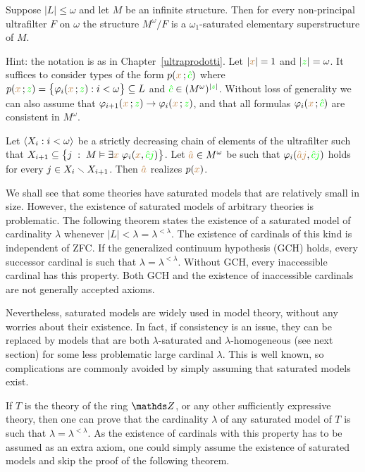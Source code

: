 \documentclass[creche.tex]{subfiles}
\begin{document}
\begin{exercise}
Suppose $|L|\le\omega$ and let $M$ be an infinite structure. Then for every non-principal ultrafilter $F$ on $\omega$ the structure $M^\omega/F$ is a $\omega_1$-saturated elementary superstructure of $M$.

Hint: the notation is as in Chapter~\ref{ultraprodotti}. Let $|{\color{brown} x}|=1$ and 
$|{\color{green} z}|=\omega$. It suffices to consider types of the form $p({\color{brown} x}\,;{\color{green}\hat c})$ where $p({\color{brown} x}\,;{\color{green} z})=\big\{\varphi_i({\color{brown} x}\,;{\color{green} z}):i<\omega\big\}\subseteq L$ and ${\color{green}\hat c}\in(M^\omega)^{|{\color{green} z}|}$. Without loss of generality we can also assume that $\varphi_{i+1}({\color{brown} x}\,;{\color{green} z})\rightarrow\varphi_i({\color{brown} x}\,;{\color{green} z})$, and that all formulas $\varphi_i({\color{brown} x}\,;{\color{green}\hat c})$ are consistent in $M^\omega$. 

Let $\langle X_i:i<\omega\rangle$ be a strictly decreasing chain of elements of the ultrafilter such that  $X_{i+1}\subseteq\big\{j\;:\;M\vDash\exists{\color{brown}x}\;\varphi_i({\color{brown} x},{\color{green}\hat cj})\big\}$. Let ${\color{brown}\hat a}\in M^\omega$ be such that  $\varphi_i({\color{brown}\hat aj},{\color{green}\hat cj})$ holds for every $j\in X_i\smallsetminus X_{i+1}$. Then ${\color{brown}\hat a}$ realizes $p({\color{brown} x})$.\QED
\end{exercise}

We shall see that some theories have saturated models that are relatively small in size.
However, the existence of saturated models of arbitrary theories is problematic.
The following theorem states the existence of a saturated model of cardinality $\lambda$ whenever $|L|<\lambda=\lambda^{<\lambda}$.
The existence of cardinals of this kind is independent of ZFC.
If the generalized continuum hypothesis (GCH) holds, every successor cardinal is such that $\lambda=\lambda^{<\lambda}$.
Without GCH, every inaccessible cardinal has this property.
Both GCH and the existence of inaccessible cardinals are not generally accepted axioms.

Nevertheless, saturated models are widely used in model theory, without any worries about their existence.
In fact, if consistency is an issue, they can be replaced by models that are both $\lambda$-saturated and $\lambda$-homogeneous (see next section) for some less problematic large cardinal $\lambda$.
This is well known, so complications are commonly avoided by simply assuming that saturated models exist.

If $T$ is the theory of the ring $\ZZ$, or any other sufficiently expressive theory, then one can prove that the cardinality $\lambda$ of any saturated model of $T$ is such that $\lambda=\lambda^{<\lambda}$.
As the existence of cardinals with this property has to be assumed as an extra axiom, one could simply assume the existence of saturated models and skip the proof of the following theorem.
\end{document}
